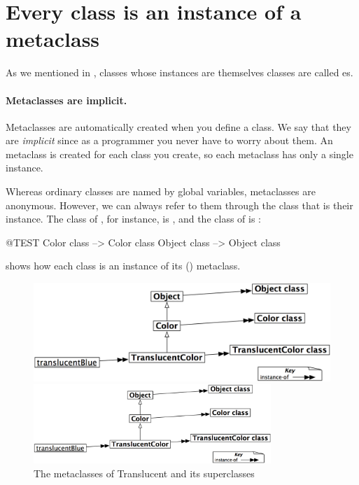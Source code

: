 \documentclass[a4paper,10pt,twoside]{book}
\begin{document}
\section{Every class is an instance of a metaclass}


As we mentioned in , classes whose instances are themselves classes are called es.

\paragraph{Metaclasses are implicit.}
Metaclasses are automatically created when you define a class. We say that they are \emph{implicit} since as a programmer you never have to worry about them. An  metaclass is created for each class you create, so each metaclass has only a single instance.

Whereas ordinary classes are named by global variables, metaclasses are anonymous.
However, we can always refer to them through the class that is their instance.
The class of , for instance, is , and the class of  is :
\begin{code}{@TEST}
Color class   --> Color class
Object class --> Object class
\end{code}

\noindent
{} shows how each class is an instance of its () metaclass.

\begin{center}
\begin{figure}[!ht]
\ifluluelse
	{\centerline {\includegraphics[width=\textwidth]{TranslucentMetaclasses}}}
	{\centerline {\includegraphics[width=0.8\textwidth]{TranslucentMetaclasses}}}
\caption{The metaclasses of Translucent and its superclasses\label{fig:translucentmetaclasses}}
\end{figure}
\end{center}
\end{document}
